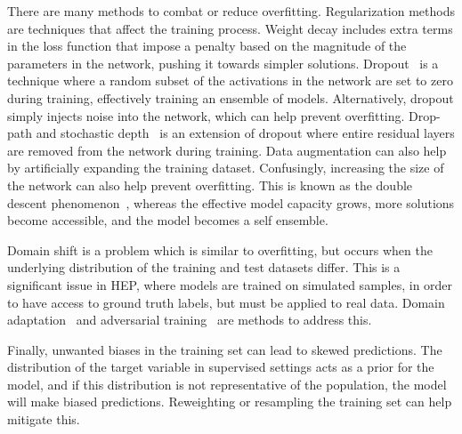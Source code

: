 There are many methods to combat or reduce overfitting.
Regularization methods are techniques that affect the training process.
Weight decay includes extra terms in the loss function that impose a penalty based on the magnitude of the parameters in the network, pushing it towards simpler solutions.
Dropout~\cite{Dropout} is a technique where a random subset of the activations in the network are set to zero during training, effectively training an ensemble of models.
Alternatively, dropout simply injects noise into the network, which can help prevent overfitting.
Drop-path and stochastic depth~\cite{DeepNetworksStochastic} is an extension of dropout where entire residual layers are removed from the network during training.
Data augmentation can also help by artificially expanding the training dataset.
Confusingly, increasing the size of the network can also help prevent overfitting.
This is known as the double descent phenomenon~\cite{UnderstandingDoubleDescent}, whereas the effective model capacity grows, more solutions become accessible, and the model becomes a self ensemble.

Domain shift is a problem which is similar to overfitting, but occurs when the underlying distribution of the training and test datasets differ.
This is a significant issue in HEP, where models are trained on simulated samples, in order to have access to ground truth labels, but must be applied to real data.
Domain adaptation~\cite{UnsupervisedDomainAdaptation} and adversarial training~\cite{EnhancingGeneralizationHigh} are methods to address this.

Finally, unwanted biases in the training set can lead to skewed predictions.
The distribution of the target variable in supervised settings acts as a prior for the model, and if this distribution is not representative of the population, the model will make biased predictions.
Reweighting or resampling the training set can help mitigate this.
